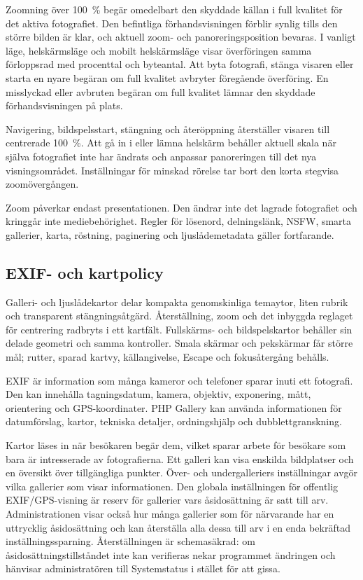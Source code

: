 \documentclass[11pt,a4paper]{article}
\begin{document}
Zoomning över 100~\% begär omedelbart den skyddade källan i full kvalitet för
det aktiva fotografiet. Den befintliga förhandsvisningen förblir synlig tills
den större bilden är klar, och aktuell zoom- och panoreringsposition bevaras. I
vanligt läge, helskärmsläge och mobilt helskärmsläge visar överföringen samma
förloppsrad med procenttal och byteantal. Att byta fotografi, stänga visaren
eller starta en nyare begäran om full kvalitet avbryter föregående överföring.
En misslyckad eller avbruten begäran om full kvalitet lämnar den skyddade
förhandsvisningen på plats.

Navigering, bildspelsstart, stängning och återöppning återställer visaren till
centrerade 100~\%. Att gå in i eller lämna helskärm behåller aktuell skala när
själva fotografiet inte har ändrats och anpassar panoreringen till det nya
visningsområdet. Inställningar för minskad rörelse tar bort den korta stegvisa
zoomövergången.

Zoom påverkar endast presentationen. Den ändrar inte det lagrade fotografiet och
kringgår inte mediebehörighet. Regler för lösenord, delningslänk, NSFW, smarta
gallerier, karta, röstning, paginering och ljuslådemetadata gäller fortfarande.

\subsection{EXIF- och kartpolicy}

Galleri- och ljuslådekartor delar kompakta genomskinliga temaytor, liten rubrik
och transparent stängningsåtgärd. Återställning, zoom och det inbyggda reglaget
för centrering radbryts i ett kartfält. Fullskärms- och bildspelskartor behåller
sin delade geometri och samma kontroller. Smala skärmar och pekskärmar får
större mål; rutter, sparad kartvy, källangivelse, Escape och fokusåtergång
behålls.

EXIF är information som många kameror och telefoner sparar inuti ett fotografi.
Den kan innehålla tagningsdatum, kamera, objektiv, exponering, mått, orientering
och GPS-koordinater. PHP Gallery kan använda informationen för datumförslag,
kartor, tekniska detaljer, ordningshjälp och dubblettgranskning.

Kartor läses in när besökaren begär dem, vilket sparar arbete för besökare som
bara är intresserade av fotografierna. Ett galleri kan visa enskilda bildplatser
och en översikt över tillgängliga punkter. Över- och undergalleriers
inställningar avgör vilka gallerier som visar informationen. Den globala
inställningen för offentlig EXIF/GPS-visning är reserv för gallerier vars
åsidosättning är satt till arv. Administrationen visar också hur många gallerier
som för närvarande har en uttrycklig åsidosättning och kan återställa alla dessa
till arv i en enda bekräftad inställningssparning. Återställningen är
schemasäkrad: om åsidosättningstillståndet inte kan verifieras nekar programmet
ändringen och hänvisar administratören till Systemstatus i stället för att
gissa.
\end{document}
